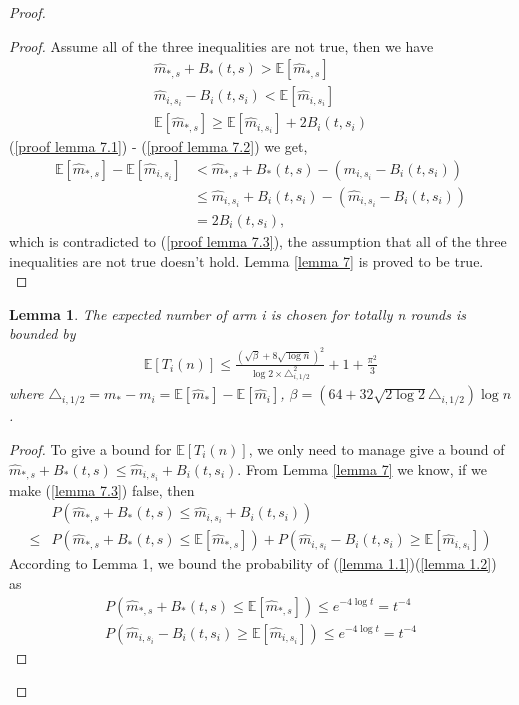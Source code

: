 \documentclass{article}
\theoremstyle{plain}
\newtheorem{lemma}{Lemma}
\begin{document}
\begin{proof}
\begin{proof}
Assume all of the three inequalities are not true, then we have
    \begin{align}
        \label{proof lemma 7.1}
         \hat{m}_{*, s} + B_*(t, s) >  \mathbb{E}[\hat{m}_{*, s}]\\
        \label{proof lemma 7.2}
        \hat{m}_{i, s_i} - B_i(t, s_i) < \mathbb{E}[\hat{m}_{i, s_i}]\\
        \label{proof lemma 7.3}
        \mathbb{E}[\hat{m}_{*, s}] \geq \mathbb{E}[\hat{m}_{i, s_i}] + 2 B_i(t, s_i)
    \end{align}
    (\ref{proof lemma 7.1}) - (\ref{proof lemma 7.2}) we get,
    \begin{align}
         \mathbb{E}[\hat{m}_{*, s}] - \mathbb{E}[\hat{m}_{i, s_i}] &<
         \hat{m}_{*, s} + B_*(t, s) - (\hat{m}_{i, s_i} - B_i(t, s_i)) \\
        & \leq \hat{m}_{i, s_i} + B_i(t, s_i) - (\hat{m}_{i, s_i} - B_i(t, s_i)) \\
        &= 2 B_i(t, s_i),
    \end{align}
    which is contradicted to (\ref{proof lemma 7.3}), the assumption that all of the three inequalities are not true doesn't hold. Lemma \ref{lemma 7} is proved to be true.\\
\end{proof}

\begin{lemma}
\label{Lemma 8: bound for E[T_i(n)]}
    The expected number of arm i is chosen for totally n rounds is bounded by
    \begin{align}
        \mathbb{E}[T_i(n)] \leq  \frac{(\sqrt{\beta} + 8 \sqrt{\log n})^2}{\log 2 \times \triangle_{i, 1/2}^2} + 1 + \frac{\pi^2}{3}
    \end{align}
    where $\triangle_{i, 1/2} = m_\ast - m_i = \mathbb{E}[\hat{m}_\ast] - \mathbb{E}[\hat{m}_i]$, $\beta = (64 + 32 \sqrt{2 \log 2} \triangle_{i,1/2} )\log n$.
\end{lemma}

\begin{proof}
To give a bound for $\mathbb{E}[T_i(n)]$, we only need to manage give a bound of $\hat{m}_{*, s} + B_*(t, s)  \leq \hat{m}_{i, s_i} + B_i(t, s_i)$. From Lemma \ref{lemma 7} we know, if we make (\ref{lemma 7.3}) false, then
\begin{align}
    & P(\hat{m}_{*, s} + B_*(t, s)  \leq \hat{m}_{i, s_i} + B_i(t, s_i)) \\
    \leq &  P(\hat{m}_{*, s} + B_*(t, s) \leq  \mathbb{E}[\hat{m}_{*, s}]) + P(\hat{m}_{i, s_i} - B_i(t, s_i) \geq \mathbb{E}[\hat{m}_{i, s_i}])
\end{align}
According to Lemma 1, we bound the probability of (\ref{lemma 1.1})(\ref{lemma 1.2}) as
    \begin{align}
        P(\hat{m}_{*, s} + B_*(t, s) \leq  \mathbb{E}[\hat{m}_{*, s}]) \leq  e^{-4\log t} = t^{-4}\\
        P(\hat{m}_{i, s_i} - B_i(t, s_i) \geq \mathbb{E}[\hat{m}_{i, s_i}])  \leq  e^{-4\log t} = t^{-4}
    \end{align}


\end{proof}
\end{proof}
\end{document}
